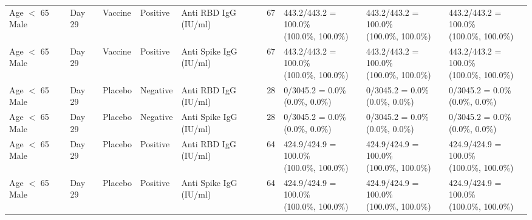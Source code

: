 \documentclass[]{book}
\theoremstyle{definition}
\theoremstyle{definition}
\theoremstyle{definition}
\newcommand{\1}{\mathbbm{1}}
\begin{document}
\begin{landscape}
\begin{ThreePartTable}
\begin{longtable}[t]{>{\raggedright\arraybackslash}p{2.7cm}llllllll}
\hspace{1em}Age $<$ 65 Male & Day 29 & Vaccine & Positive & Anti RBD IgG (IU/ml) & 67 & \makecell[l]{443.2/443.2 = 100.0\%\\(100.0\%, 100.0\%)} & \makecell[l]{443.2/443.2 = 100.0\%\\(100.0\%, 100.0\%)} & \makecell[l]{443.2/443.2 = 100.0\%\\(100.0\%, 100.0\%)}\\
\hspace{1em}Age $<$ 65 Male & Day 29 & Vaccine & Positive & Anti Spike IgG (IU/ml) & 67 & \makecell[l]{443.2/443.2 = 100.0\%\\(100.0\%, 100.0\%)} & \makecell[l]{443.2/443.2 = 100.0\%\\(100.0\%, 100.0\%)} & \makecell[l]{443.2/443.2 = 100.0\%\\(100.0\%, 100.0\%)}\\
\hspace{1em}Age $<$ 65 Male & Day 29 & Placebo & Negative & Anti RBD IgG (IU/ml) & 28 & \makecell[l]{0/3045.2 = 0.0\%\\(0.0\%, 0.0\%)} & \makecell[l]{0/3045.2 = 0.0\%\\(0.0\%, 0.0\%)} & \makecell[l]{0/3045.2 = 0.0\%\\(0.0\%, 0.0\%)}\\
\hspace{1em}Age $<$ 65 Male & Day 29 & Placebo & Negative & Anti Spike IgG (IU/ml) & 28 & \makecell[l]{0/3045.2 = 0.0\%\\(0.0\%, 0.0\%)} & \makecell[l]{0/3045.2 = 0.0\%\\(0.0\%, 0.0\%)} & \makecell[l]{0/3045.2 = 0.0\%\\(0.0\%, 0.0\%)}\\
\hspace{1em}Age $<$ 65 Male & Day 29 & Placebo & Positive & Anti RBD IgG (IU/ml) & 64 & \makecell[l]{424.9/424.9 = 100.0\%\\(100.0\%, 100.0\%)} & \makecell[l]{424.9/424.9 = 100.0\%\\(100.0\%, 100.0\%)} & \makecell[l]{424.9/424.9 = 100.0\%\\(100.0\%, 100.0\%)}\\
\hspace{1em}Age $<$ 65 Male & Day 29 & Placebo & Positive & Anti Spike IgG (IU/ml) & 64 & \makecell[l]{424.9/424.9 = 100.0\%\\(100.0\%, 100.0\%)} & \makecell[l]{424.9/424.9 = 100.0\%\\(100.0\%, 100.0\%)} & \makecell[l]{424.9/424.9 = 100.0\%\\(100.0\%, 100.0\%)}\\

\end{longtable}
\end{ThreePartTable}
\end{landscape}
\end{document}
